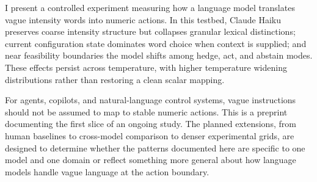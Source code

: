 \documentclass[11pt]{article}
\begin{document}
I present a controlled experiment measuring how a language model translates vague intensity words into numeric actions. In this testbed, Claude Haiku preserves coarse intensity structure but collapses granular lexical distinctions; current configuration state dominates word choice when context is supplied; and near feasibility boundaries the model shifts among hedge, act, and abstain modes. These effects persist across temperature, with higher temperature widening distributions rather than restoring a clean scalar mapping.

For agents, copilots, and natural-language control systems, vague instructions should not be assumed to map to stable numeric actions. This is a preprint documenting the first slice of an ongoing study. The planned extensions, from human baselines to cross-model comparison to denser experimental grids, are designed to determine whether the patterns documented here are specific to one model and one domain or reflect something more general about how language models handle vague language at the action boundary.



\end{document}
